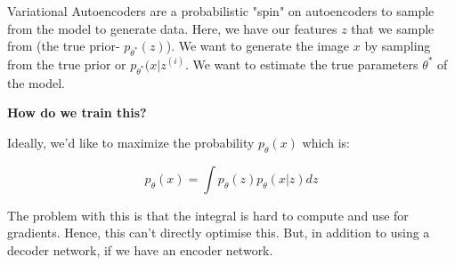 Variational Autoencoders are a probabilistic "spin" on autoencoders to sample from the model to generate data. Here, we have our features $z$ that we sample from (the true prior- $p_{\theta^*}(z)$). We want to generate the image $x$ by sampling from the true prior or $p_{\theta^*}(x|z^{(i)}$. We want to estimate the true parameters $\theta^*$ of the model. 

\textbf{How do we train this?}

Ideally, we'd like to maximize the probability $p_{\theta}(x)$ which is:

\begin{equation}
    p_{\theta}(x) = \int p_{\theta}(z)p_{\theta}(x|z)dz
\end{equation}

The problem with this is that the integral is hard to compute and use for gradients. Hence, this can't directly optimise this. But, in addition to using a decoder network, if we have an encoder network.